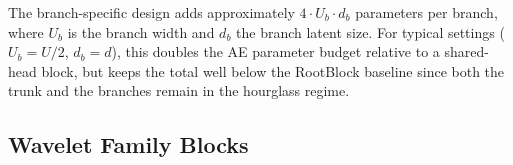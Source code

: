 \documentclass[11pt,a4paper]{article}
\begin{document}
\begin{table}
  \caption{Single-trunk vs.\ branch-specific AE designs.}
  \label{tab:branch-ae}
  \centering
\end{table}

The branch-specific design adds approximately $4 \cdot U_b \cdot d_b$ parameters per branch, where $U_b$ is the branch width and $d_b$ the branch latent size. For typical settings ($U_b = U/2$, $d_b = d$), this doubles the AE parameter budget relative to a shared-head block, but keeps the total well below the RootBlock baseline since both the trunk and the branches remain in the hourglass regime.

\subsection{Wavelet Family Blocks}
\label{sec:wavelet}
\end{document}
